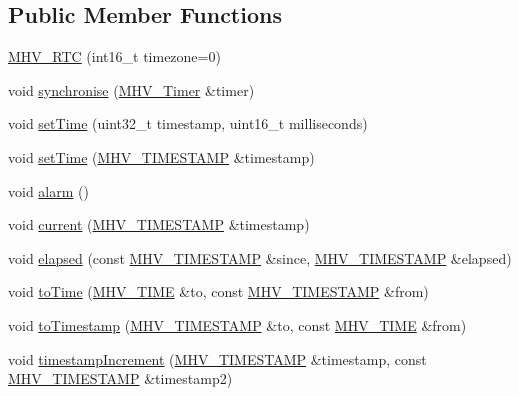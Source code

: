 \subsection*{Public Member Functions}
\begin{DoxyCompactItemize}
\item 
\hyperlink{class_m_h_v___r_t_c_ae896730a55cb1a66917a6fa627dfeeaf}{M\-H\-V\-\_\-\-R\-T\-C} (int16\-\_\-t timezone=0)
\item 
void \hyperlink{class_m_h_v___r_t_c_aa103a5ccf2573e97760ad13953621d15}{synchronise} (\hyperlink{class_m_h_v___timer}{M\-H\-V\-\_\-\-Timer} \&timer)
\item 
void \hyperlink{class_m_h_v___r_t_c_a426e7a34e8a3957d378a634c2c2d00d8}{set\-Time} (uint32\-\_\-t timestamp, uint16\-\_\-t milliseconds)
\item 
void \hyperlink{class_m_h_v___r_t_c_a9eba3cfa73969390764bea958ed276ab}{set\-Time} (\hyperlink{_m_h_v___r_t_c_8h_a1e30d3a92b1b868286bd0d619245d8a6}{M\-H\-V\-\_\-\-T\-I\-M\-E\-S\-T\-A\-M\-P} \&timestamp)
\item 
void \hyperlink{class_m_h_v___r_t_c_a949570f89977560cc68dc909e7d0a805}{alarm} ()
\item 
void \hyperlink{class_m_h_v___r_t_c_ad01b7a3e8049fb64bf9f490e97b89696}{current} (\hyperlink{_m_h_v___r_t_c_8h_a1e30d3a92b1b868286bd0d619245d8a6}{M\-H\-V\-\_\-\-T\-I\-M\-E\-S\-T\-A\-M\-P} \&timestamp)
\item 
void \hyperlink{class_m_h_v___r_t_c_ac29cd961ae085c0b19e439f6a41c2941}{elapsed} (const \hyperlink{_m_h_v___r_t_c_8h_a1e30d3a92b1b868286bd0d619245d8a6}{M\-H\-V\-\_\-\-T\-I\-M\-E\-S\-T\-A\-M\-P} \&since, \hyperlink{_m_h_v___r_t_c_8h_a1e30d3a92b1b868286bd0d619245d8a6}{M\-H\-V\-\_\-\-T\-I\-M\-E\-S\-T\-A\-M\-P} \&elapsed)
\item 
void \hyperlink{class_m_h_v___r_t_c_aa0a908785e5445b1ab5d3bdb20f5fc62}{to\-Time} (\hyperlink{_m_h_v___r_t_c_8h_adace8912943ac21c837360427880df71}{M\-H\-V\-\_\-\-T\-I\-M\-E} \&to, const \hyperlink{_m_h_v___r_t_c_8h_a1e30d3a92b1b868286bd0d619245d8a6}{M\-H\-V\-\_\-\-T\-I\-M\-E\-S\-T\-A\-M\-P} \&from)
\item 
void \hyperlink{class_m_h_v___r_t_c_a3aecb460c309ca773933e0c82bbd7819}{to\-Timestamp} (\hyperlink{_m_h_v___r_t_c_8h_a1e30d3a92b1b868286bd0d619245d8a6}{M\-H\-V\-\_\-\-T\-I\-M\-E\-S\-T\-A\-M\-P} \&to, const \hyperlink{_m_h_v___r_t_c_8h_adace8912943ac21c837360427880df71}{M\-H\-V\-\_\-\-T\-I\-M\-E} \&from)
\item 
void \hyperlink{class_m_h_v___r_t_c_a666d907f0699c61337891adb040d5114}{timestamp\-Increment} (\hyperlink{_m_h_v___r_t_c_8h_a1e30d3a92b1b868286bd0d619245d8a6}{M\-H\-V\-\_\-\-T\-I\-M\-E\-S\-T\-A\-M\-P} \&timestamp, const \hyperlink{_m_h_v___r_t_c_8h_a1e30d3a92b1b868286bd0d619245d8a6}{M\-H\-V\-\_\-\-T\-I\-M\-E\-S\-T\-A\-M\-P} \&timestamp2)

\end{DoxyCompactItemize}
